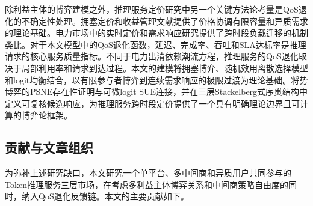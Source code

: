 \documentclass[UTF8,11pt]{ctexart}
\begin{document}
除利益主体的博弈建模之外，推理服务定价研究中另一个关键方法论考量是QoS退化的不确定性处理。拥塞定价和收益管理文献提供了价格协调有限容量和异质需求的理论基础\cite{vickrey1969congestion,gallego1994dynamic,elmaghraby2003dynamic,bitran2003overview,talluri2004revenue,phillips2005pricing}。电力市场中的实时定价和需求响应研究提供了跨时段负载迁移的机制类比\cite{schweppe1988spot,borenstein2005long,albadi2008summary,faruqui2010household,siano2014demand}。对于本文模型中的QoS退化函数，延迟、完成率、吞吐和SLA达标率是推理请求的核心服务质量指标。不同于电力出清依赖潮流方程，推理服务的QoS退化取决于局部利用率和请求到达过程。本文的建模将拥塞博弈、随机效用离散选择模型和logit均衡结合，以有限参与者博弈到连续需求响应的极限过渡为理论基础\cite{rosenthal1973class,monderer1996potential,wardrop1952some,sandholm2010population,mcfadden1974conditional,train2009discrete}。将势博弈的PSNE存在性证明与可微logit SUE连接，并在三层Stackelberg式序贯结构中定义可复核候选响应，为推理服务跨时段定价提供了一个具有明确理论边界且可计算的博弈论框架。

\subsection{贡献与文章组织}

为弥补上述研究缺口，本文研究一个单平台、多中间商和异质用户共同参与的Token推理服务三层市场，在考虑多利益主体博弈关系和中间商策略自由度的同时，纳入QoS退化反馈链。本文的主要贡献如下。
\end{document}
